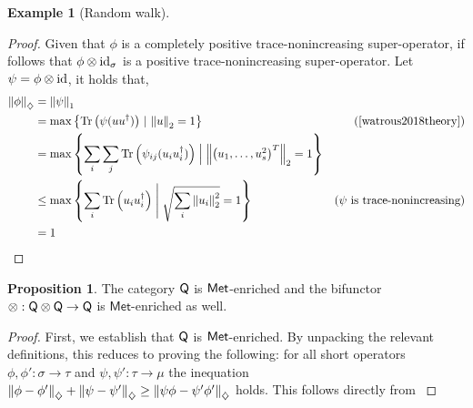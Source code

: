 \documentclass[10pt,a4paper]{amsart}
\theoremstyle{definition}
\theoremstyle{definition}
\newtheorem{example}[definition]{Example}
\theoremstyle{definition}
\theoremstyle{definition}
\newtheorem{proposition}[definition]{Proposition}
\theoremstyle{definition}
\theoremstyle{definition}
\begin{document}
\begin{example}[Random walk]
  \begin{proof}
    Given that $\phi$ is a  completely positive trace-nonincreasing super-operator, if follows that $ \phi \otimes \mathrm{id}_{\sigma}$ is a positive trace-nonincreasing super-operator. Let $\psi = \phi \otimes \mathrm{id}$, it holds that,
    \begin{align*}
      \diamondnorm{\phi}& =\tracenorm{\psi}\\
       &= \max \left\{\tr \left( \psi (u u^\dag)\right) \, \vert \, \euclideannorm{u}=1 \right\}  & \left(\text{\cite[Theorem 3.39]{watrous2018theory}}\right)\\
      & = \max \left\{ \sum_i \sum_j \tr \left( \psi_{ij} (u_i u_i^\dag)\right) \Bigm|  \euclideannorm{\begin{pmatrix} u_1, \ldots, u_s^2 \end{pmatrix}^T}=1 \right\} \\
      & \leq \max \left\{ \sum_i \tr \left( u_i u_i^\dag \right) \Biggm| \sqrt{\sum_i \euclideannorm{u_i}^2}=1 \right\}   & (\psi \text{ is trace-nonincreasing}) \\
      & = 1
    \end{align*}
    
    
    
  \end{proof}

  

\begin{proposition}
  The category $\mathsf{Q}$ is $\mathsf{Met}$-enriched and the bifunctor $\otimes : \mathsf{Q} \otimes \mathsf{Q} \to \mathsf{Q}$ is $\mathsf{Met}$-enriched as well.
\end{proposition}



\begin{proof}
  First, we establish that $\mathsf{Q}$ is $\mathsf{Met}$-enriched. By unpacking the relevant definitions, this reduces to proving the following: for all short operators $\phi, \phi' : \sigma \to \tau$ and $\psi, \psi' : \tau \to \mu$ the inequation $\left\lVert \phi-\phi' \right\rVert_{\diamondsuit} + \left\lVert \psi-\psi' \right\rVert_{\diamondsuit} \geq \left\lVert \psi\phi-\psi'\phi' \right\rVert_{\diamondsuit} $ holds. This follows directly from \cite[Proposition 3.38 (second statement)]{watrous2018theory}


\end{proof}
\end{example}
\end{document}
